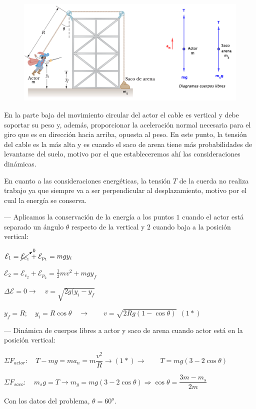 \begin{figure}[H]
	\centering
	\includegraphics[width=.9\textwidth]{imagenes/imagenes04/T04IM24.png}
\end{figure}

En la parte baja del movimiento circular del actor el cable es vertical y debe soportar su peso y, además, proporcionar la aceleración normal necesaria para el giro que es en dirección hacia arriba, opuesta al peso. En este punto, la tensión del cable es la más alta y es cuando el saco de arena tiene más probabilidades de levantarse del suelo, motivo por el que estableceremos ahí las consideraciones dinámicas.

En cuanto a las consideraciones energéticas, la tensión $T$ de la cuerda no realiza trabajo ya que siempre va a ser perpendicular al desplazamiento, motivo por el cual la energía se conserva. 

--- Aplicamos la conservación de la energía a los puntos $1$ cuando el actor está separado un ángulo $\theta$ respecto de la vertical y $2$ cuando baja a la posición vertical:

$\mathcal E_1=\cancelto{0}{\mathcal E_{c_1}}+\mathcal E_{p_1}=mgy_i$

$\mathcal E_2=\mathcal E_{c_2}+\mathcal E_{p_2}=\frac 1 2 m v^2+ mgy_f$

$\Delta \mathcal E=0 \to \quad v=\sqrt{2g(y_i-y_f}$

$y_f=R; \quad y_i=R\cos \theta \quad \to \qquad  v=\sqrt{2Rg(1-\cos \theta)} \ \ (1*)$

--- Dinámica de cuerpos libres a  actor y saco de arena cuando actor está en la posición vertical:

$\Sigma F_{actor}: \quad T-mg=ma_n=m\dfrac{v^2}R
\to (1*) \to \qquad T=mg(3-2\cos \theta)$


$\Sigma F_{saco}: \quad m_sg=T \to m_g=mg(3-2\cos \theta) \Rightarrow \cos \theta=\dfrac{3m-m_s}{2m}$

Con los datos del problema, $\theta=60^o$.

